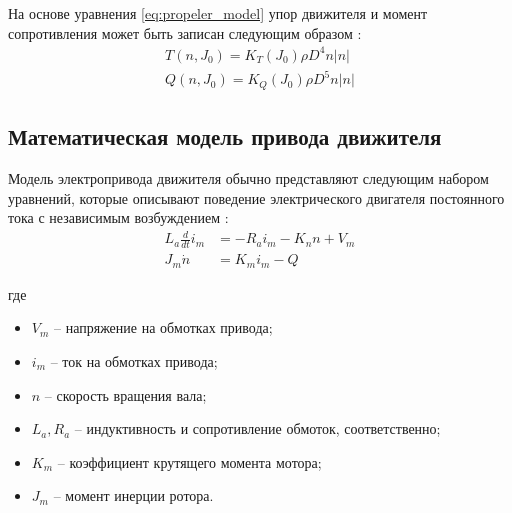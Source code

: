 На основе уравнения \ref{eq:propeler_model} упор движителя и момент сопротивления может быть записан следующим образом \cite{пантов1973основы}:
\begin{equation}
    \label{eq:kt_kq}
    \begin{array}{l}
        T(n, J_0) = K_T (J_0) \rho D^4 n |n|\\
        Q(n, J_0) = K_Q (J_0) \rho D^5 n |n|
    \end{array}
\end{equation}

\subsection{Математическая модель привода движителя}

Модель электропривода движителя обычно представляют следующим набором уравнений, которые описывают поведение электрического двигателя постоянного тока с независимым возбуждением \cite{zhao2015torque}:
\begin{equation}
	\label{eq:motor_model}
	\begin{array}{ll}
	L_a\frac{d}{dt}i_m &=-R_ai_m-K_n n + V_m \\
    J_m\dot{n} &= K_m i_m - Q
	\end{array}
\end{equation}

\noindent где
\begin{itemize}
    \item $V_m$ -- напряжение на обмотках привода;
    \item $i_m$ -- ток на обмотках привода;
    \item $n$ -- скорость вращения вала;
    \item $L_a, R_a$ -- индуктивность и сопротивление обмоток, соответственно;
    \item $K_m$ -- коэффициент крутящего момента мотора;
    \item $J_m$ -- момент инерции ротора.
\end{itemize}



